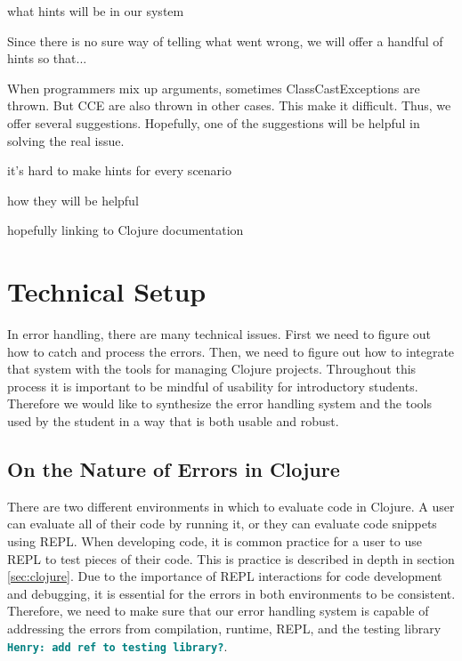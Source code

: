 \documentclass[12pt]{article}
\newcommand{\comment}[1]{{\bf \tt  {#1}}}
\newcommand{\emcomment}[1]{\textcolor{ForestGreen}{\comment{Elena: {#1}}}}
\newcommand{\hfcomment}[1]{\textcolor{Teal}{\comment{Henry: {#1}}}}
\begin{document}
what hints will be in our system

Since there is no sure way of telling what went wrong, we will offer a handful of hints so that...

When programmers mix up arguments, sometimes ClassCastExceptions are thrown. But CCE are also thrown in other cases. This make it difficult. Thus, we offer several suggestions. Hopefully, one of the suggestions will be helpful in solving the real issue.

it's hard to make hints for every scenario

how they will be helpful

hopefully linking to Clojure documentation

\section{Technical Setup}\label{sec:technical}
In error handling, there are many technical issues. First we need to figure out how to catch and process the errors. Then, we need to figure out how to integrate that system with the tools for managing Clojure projects. Throughout this process it is important to be mindful of usability for introductory students. Therefore we would like to synthesize the error handling system and the tools used by the student in a way that is both usable and robust.


\subsection{On the Nature of Errors in Clojure}


There are two different environments in which to evaluate code in Clojure. A user can evaluate all of their code by running it, or they can evaluate code snippets using REPL. When developing code, it is common practice for a user to use REPL to test pieces of their code. This is practice is described in depth in section \ref{sec:clojure}. Due to the importance of REPL interactions for code development and debugging, it is essential for the errors in both environments to be consistent. Therefore, we need to make sure that our error handling system is capable of addressing the errors from compilation, runtime,  REPL, and the testing library \hfcomment{add ref to testing library?}.
\end{document}
